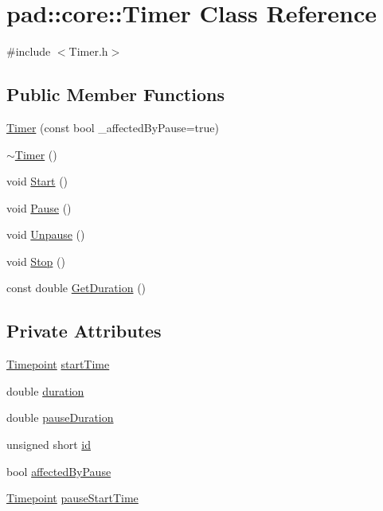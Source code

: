 \hypertarget{classpad_1_1core_1_1_timer}{}\section{pad\+:\+:core\+:\+:Timer Class Reference}
\label{classpad_1_1core_1_1_timer}


{\ttfamily \#include $<$Timer.\+h$>$}

\subsection*{Public Member Functions}
\begin{DoxyCompactItemize}
\item 
\mbox{\hyperlink{classpad_1_1core_1_1_timer_a30a7706137aea9acde41ca7ee90326e3}{Timer}} (const bool \+\_\+affected\+By\+Pause=true)
\item 
\mbox{\hyperlink{classpad_1_1core_1_1_timer_aec538febc2d52e50ad5df1b200b60d5d}{$\sim$\+Timer}} ()
\item 
void \mbox{\hyperlink{classpad_1_1core_1_1_timer_ac3c92037256639490ad979987c58a3d3}{Start}} ()
\item 
void \mbox{\hyperlink{classpad_1_1core_1_1_timer_a150118ce8a2eaa2aa2e5e827511356f9}{Pause}} ()
\item 
void \mbox{\hyperlink{classpad_1_1core_1_1_timer_a06994d900c4a882acffc4ba47b99fc85}{Unpause}} ()
\item 
void \mbox{\hyperlink{classpad_1_1core_1_1_timer_a3a3cbda30033c7c9303f34ed103d70d8}{Stop}} ()
\item 
const double \mbox{\hyperlink{classpad_1_1core_1_1_timer_a81ee8c0bd00ea230edd6c177b578ae41}{Get\+Duration}} ()
\end{DoxyCompactItemize}
\subsection*{Private Attributes}
\begin{DoxyCompactItemize}
\item 
\mbox{\hyperlink{namespacepad_1_1core_a4359864da05f393ed6e69d9d018946ad}{Timepoint}} \mbox{\hyperlink{classpad_1_1core_1_1_timer_afe9926da78b47b4c3d33fab3632903a5}{start\+Time}}
\item 
double \mbox{\hyperlink{classpad_1_1core_1_1_timer_ad76d18dd62c6965847b39e4e1f5d0f9b}{duration}}
\item 
double \mbox{\hyperlink{classpad_1_1core_1_1_timer_a4c374309dd4560bb3203c79d5f41036c}{pause\+Duration}}
\item 
unsigned short \mbox{\hyperlink{classpad_1_1core_1_1_timer_a56bb681d982af55045a5f614ba5c9e22}{id}}
\item 
bool \mbox{\hyperlink{classpad_1_1core_1_1_timer_aaf3934066247c812ced8f0b234280925}{affected\+By\+Pause}}
\item 
\mbox{\hyperlink{namespacepad_1_1core_a4359864da05f393ed6e69d9d018946ad}{Timepoint}} \mbox{\hyperlink{classpad_1_1core_1_1_timer_a0cbad14aa307f3c039b0ac15c239078d}{pause\+Start\+Time}}
\end{DoxyCompactItemize}
